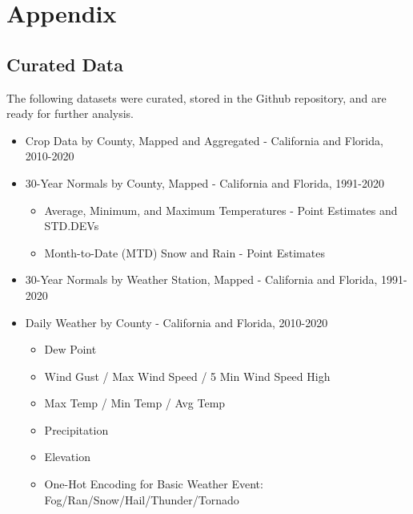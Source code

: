 \documentclass{article}
\begin{document}





\appendix
\section{Appendix}
\subsection{Curated Data}
\label{sec:curated}
The following datasets were curated, stored in the Github repository, and are ready for further analysis. 

\begin{itemize}[noitemsep]
    \item Crop Data by County, Mapped and Aggregated - California and Florida, 2010-2020
    \item 30-Year Normals by County, Mapped - California and Florida, 1991-2020
    \begin{itemize}[noitemsep]
        \item Average, Minimum, and Maximum Temperatures - Point Estimates and STD.DEVs
        \item Month-to-Date (MTD) Snow and Rain - Point Estimates
    \end{itemize}
    \item 30-Year Normals by Weather Station, Mapped - California and Florida, 1991-2020
    \item Daily Weather by County - California and Florida, 2010-2020
    \begin{itemize}[noitemsep]
        \item Dew Point
        \item Wind Gust / Max Wind Speed / 5 Min Wind Speed High
        \item Max Temp / Min Temp / Avg Temp
        \item Precipitation
        \item Elevation
        \item One-Hot Encoding for Basic Weather Event: Fog/Ran/Snow/Hail/Thunder/Tornado
    \end{itemize}
\end{itemize}
\end{document}
